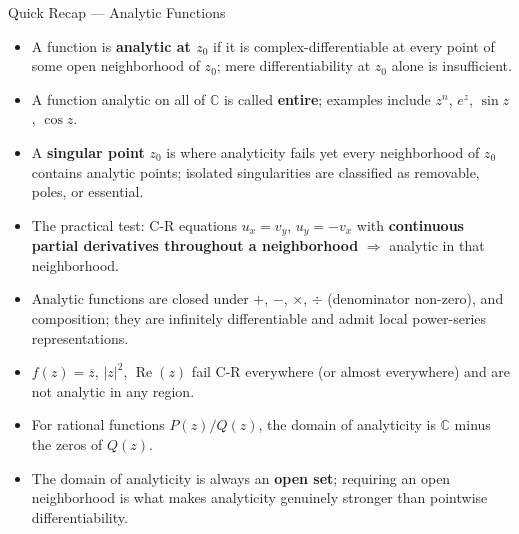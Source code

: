 \documentclass[12pt,a4paper]{article}
\begin{document}
\begin{learnbox}{Quick Recap --- Analytic Functions}
\begin{itemize}
  \item A function is \textbf{analytic at $z_0$} if it is complex-differentiable
        at every point of some open neighborhood of $z_0$; mere differentiability
        at $z_0$ alone is insufficient.

  \item A function analytic on all of $\mathbb{C}$ is called \textbf{entire};
        examples include $z^{n}$, $e^{z}$, $\sin z$, $\cos z$.

  \item A \textbf{singular point} $z_0$ is where analyticity fails yet every
        neighborhood of $z_0$ contains analytic points; isolated singularities
        are classified as removable, poles, or essential.

  \item The practical test: C-R equations $u_x = v_y$, $u_y = -v_x$ with
        \textbf{continuous partial derivatives throughout a neighborhood} $\Rightarrow$
        analytic in that neighborhood.

  \item Analytic functions are closed under $+$, $-$, $\times$, $\div$ (denominator
        non-zero), and composition; they are infinitely differentiable and admit
        local power-series representations.

  \item $f(z) = \overline{z}$, $|z|^{2}$, $\operatorname{Re}(z)$ fail C-R
        everywhere (or almost everywhere) and are not analytic in any region.

  \item For rational functions $P(z)/Q(z)$, the domain of analyticity is
        $\mathbb{C}$ minus the zeros of $Q(z)$.

  \item The domain of analyticity is always an \textbf{open set}; requiring an
        open neighborhood is what makes analyticity genuinely stronger than
        pointwise differentiability.
\end{itemize}
\end{learnbox}
\end{document}

